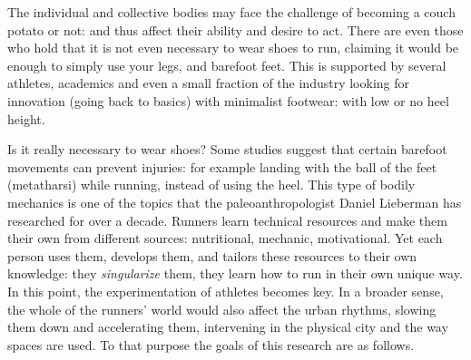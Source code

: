 The individual and collective bodies may face the challenge of becoming a couch
potato or not: and thus affect their ability and desire to act. There are even
those who hold that it is not even necessary to wear shoes to run, claiming it
would be enough to simply use your legs, and barefoot feet. This is supported
by several athletes, academics and even a small fraction of the industry looking
for innovation (going back to basics) with minimalist footwear: with low or no
heel height.


Is it really necessary to wear shoes? Some studies suggest that certain barefoot movements can prevent injuries: for example landing with the ball of the feet (metatharsi) while running, instead of using the heel. This type of bodily
mechanics is one of the topics that the paleoanthropologist Daniel Lieberman
has researched for over a decade. Runners learn technical resources and make
them their own from different sources: nutritional, mechanic, motivational. Yet
each person uses them, develops them, and tailors these resources to their own
knowledge: they \textit{singularize} them, they learn how to run in their own unique
way. In this point, the experimentation of athletes becomes key. In a broader
sense, the whole of the runners’ world would also affect the urban rhythms,
slowing them down and accelerating them, intervening in the physical city and
the way spaces are used. To that purpose the goals of this research are as
follows.



